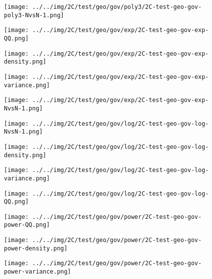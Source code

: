 \begin{figure}[H]
\centering	\texttt{[image: ../../img/2C/test/geo/gov/poly3/2C-test-geo-gov-poly3-NvsN-1.png]}
\end{figure}
\begin{figure}[H]
\centering	\texttt{[image: ../../img/2C/test/geo/gov/exp/2C-test-geo-gov-exp-QQ.png]}
\end{figure}
\begin{figure}[H]
\centering	\texttt{[image: ../../img/2C/test/geo/gov/exp/2C-test-geo-gov-exp-density.png]}
\end{figure}
\begin{figure}[H]
\centering	\texttt{[image: ../../img/2C/test/geo/gov/exp/2C-test-geo-gov-exp-variance.png]}
\end{figure}
\begin{figure}[H]
\centering	\texttt{[image: ../../img/2C/test/geo/gov/exp/2C-test-geo-gov-exp-NvsN-1.png]}
\end{figure}
\begin{figure}[H]
\centering	\texttt{[image: ../../img/2C/test/geo/gov/log/2C-test-geo-gov-log-NvsN-1.png]}
\end{figure}
\begin{figure}[H]
\centering	\texttt{[image: ../../img/2C/test/geo/gov/log/2C-test-geo-gov-log-density.png]}
\end{figure}
\begin{figure}[H]
\centering	\texttt{[image: ../../img/2C/test/geo/gov/log/2C-test-geo-gov-log-variance.png]}
\end{figure}
\begin{figure}[H]
\centering	\texttt{[image: ../../img/2C/test/geo/gov/log/2C-test-geo-gov-log-QQ.png]}
\end{figure}
\begin{figure}[H]
\centering	\texttt{[image: ../../img/2C/test/geo/gov/power/2C-test-geo-gov-power-QQ.png]}
\end{figure}
\begin{figure}[H]
\centering	\texttt{[image: ../../img/2C/test/geo/gov/power/2C-test-geo-gov-power-density.png]}
\end{figure}
\begin{figure}[H]
\centering	\texttt{[image: ../../img/2C/test/geo/gov/power/2C-test-geo-gov-power-variance.png]}
\end{figure}
